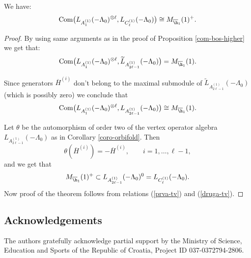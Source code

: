 \documentclass[pdftex]{sigma}
\begin{document}
\begin{theorem}
We have:
\[ {\rm Com} \big(   L _{A_1 ^{(1)}} (-\Lambda_0) ^{\otimes \ell}
,L_{C_{\ell}  ^{(1)}} (-\Lambda_0) \big)    \cong M_ { \overline{\h}_1}
(1) ^+.  \]
\end{theorem}
\begin{proof}
By using same arguments as in the proof of Proposition
\ref{com-bos-higher} we get that:
\[   {\rm Com}  \big(   L _{A_1
^{(1)}} (-\Lambda_0) ^{\otimes \ell}  ,\widetilde{ L}_{A_{2 \ell-1}
^{(1)}} (-\Lambda_0) \big) = M_ { \overline{\h}_1}  (1). \]

 Since generators $\overline{H} ^{(i)}$ don't belong to the maximal submodule of  $\widetilde{ L}_{A_{2 \ell-1}  ^{(1)}} (-\Lambda_0) $
  (which is possibly zero) we conclude that
\begin{gather} \label{prva-tv}
{\rm Com} \big(   L _{A_1 ^{(1)}} (-\Lambda_0)
^{\otimes \ell}  , L_{A_{2 \ell -1 }  ^{(1)}} (-\Lambda_0) \big) \cong
M_ { \overline{\h}_1}  (1)  .
\end{gather}

Let $\theta$ be the automorphism of order two of the vertex operator
algebra $L_{A_{2 \ell -1 }  ^{(1)}} (-\Lambda_0) $ as in Corollary
\ref{coro-orbifold}. Then
\[ \theta ( \overline{H}  ^{(i)} ) = -
\overline{H} ^{(i)}, \qquad i = 1, \dots, \ell -1,
\]
and we get that
\begin{gather} \label{druga-tv} M_ {
\overline{\h}_1}  (1) ^+ \subset L_{A_{2 \ell -1 }  ^{(1)}}
(-\Lambda_0)  ^0 = L_{C_{\ell} ^{(1)}} (-\Lambda_0) .
\end{gather}
  Now proof of the theorem follows from relations (\ref{prva-tv}) and (\ref{druga-tv}).
\end{proof}



\subsection*{Acknowledgements}


The authors gratefully acknowledge partial support by the Ministry
of Science, Education and Sports of the Republic of Croatia, Project
ID 037-0372794-2806.
\end{document}
